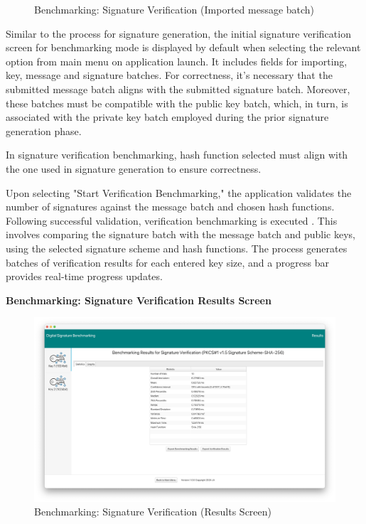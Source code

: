 \documentclass[]{final_report}
\begin{document}
\begin{figure}[H]
\begin{minipage}{0.58\textwidth}
       \caption{Benchmarking: Signature Verification (Imported message batch)}
        \label{fig:image2}
    \end{minipage}
\end{figure}

Similar to the process for signature generation, the initial signature verification screen for benchmarking mode is displayed by default when selecting the relevant option from main menu on application launch. It includes fields for importing, key, message and signature batches. For correctness, it's necessary that the submitted message batch aligns with the submitted signature batch. Moreover, these batches must be compatible with the public key batch, which, in turn, is associated with the private key batch employed during the prior signature generation phase.

In signature verification benchmarking, hash function selected must align with the one used in signature generation to ensure correctness. 

Upon selecting "Start Verification Benchmarking," the application validates the number of signatures against the message batch and chosen hash functions.  Following successful validation,  verification benchmarking is executed . This involves comparing the signature batch with the message batch and public keys, using the selected signature scheme and hash functions. The process generates batches of verification results for each entered key size, and a progress bar provides real-time progress updates.

\newpage
\textbf{Benchmarking: Signature Verification Results Screen}

\begin{figure}[H]
    \centering
    \includegraphics[scale= 0.325]{main_pictures/ui/verifying/benchmarking/verifying2.png}
   \caption{Benchmarking: Signature Verification (Results Screen)}
\end{figure}
\end{document}
